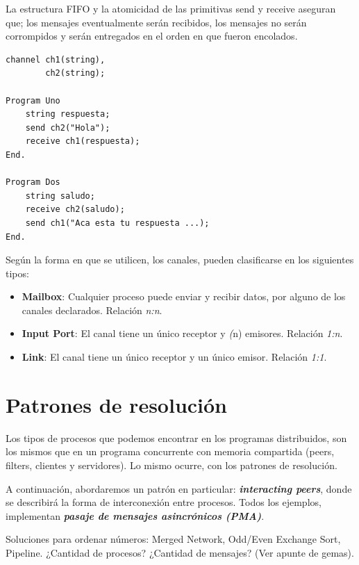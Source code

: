 \documentclass[a4paper, 10pt]{report}
\begin{document}
La estructura FIFO y la atomicidad de las primitivas send y receive aseguran que; los mensajes eventualmente serán recibidos, los mensajes no serán corrompidos y serán entregados en el orden en que fueron encolados.


\begin{lstlisting}[multicols=2]
channel ch1(string),
        ch2(string);

Program Uno
    string respuesta;
    send ch2("Hola");
    receive ch1(respuesta);
End.

Program Dos
    string saludo;
    receive ch2(saludo);
    send ch1("Aca esta tu respuesta ...);
End.
\end{lstlisting}

Según la forma en que se utilicen, los canales, pueden clasificarse en los siguientes tipos:

\begin{itemize}
    \item \textbf{Mailbox}: Cualquier proceso puede enviar y recibir datos, por alguno de los canales declarados. Relación \emph{n:n}.
    \item \textbf{Input Port}: El canal tiene un único receptor y \emph(n) emisores. Relación \emph{1:n}.
    \item \textbf{Link}: El canal tiene un único receptor y un único emisor. Relación \emph{1:1}.
\end{itemize}

\chapter{Patrones de resolución}

Los tipos de procesos que podemos encontrar en los programas distribuidos, son los mismos que en un programa concurrente con memoria compartida (peers, filters, clientes y servidores).
Lo mismo ocurre, con los patrones de resolución.

A continuación, abordaremos un patrón en particular: \textbf{\emph{interacting peers}}, donde se describirá la forma de interconexión entre procesos. Todos los ejemplos, implementan \textbf{\emph{pasaje de mensajes asincrónicos (PMA)}}.

\begin{basic_box}
     Soluciones para ordenar números: Merged Network, Odd/Even Exchange Sort, Pipeline. ¿Cantidad de procesos? ¿Cantidad de mensajes? (Ver apunte de gemas).
\end{basic_box}
\end{document}
